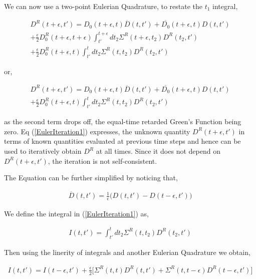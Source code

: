 \documentclass{amsart}
\begin{document}
    We can now use a two-point Eulerian Quadrature, to restate the $t_1$ integral,
    
    \begin{multline}\label{Euler}
        D^R(t+\epsilon , t') = D_0(t+\epsilon , t)\overline{D}(t , t')+\overline{D_0}(t+\epsilon , t)D(t , t')
        \\ + \frac{\epsilon}{2} D_0^R(t+\epsilon, t+\epsilon)\int^{t+\epsilon}_{t'} dt_2 \Sigma^R (t+\epsilon,t_2) D^R(t_2, t')
        \\ + \frac{\epsilon}{2} D_0^R(t+\epsilon, t)\int^{t}_{t'} dt_2 \Sigma^R (t,t_2) D^R(t_2, t')
    \end{multline}
    
    or,
    
    \begin{multline}\label{EulerIteration1}
        D^R(t+\epsilon , t') = D_0(t+\epsilon , t)\overline{D}(t , t')+\overline{D_0}(t+\epsilon , t)D(t , t')
        \\ + \frac{\epsilon}{2} D_0^R(t+\epsilon, t)\int^{t}_{t'} dt_2 \Sigma^R (t,t_2) D^R(t_2, t')
    \end{multline}
    
    as the second term drops off, the equal-time retarded Green's Function being zero. Eq (\ref{EulerIteration1}) expresses, the unknown quantity $D^R(t+\epsilon , t')$ in terms of known quantities evaluated at previous time steps and hence can be used to iteratively obtain $D^R$ at all times. Since it does not depend on $D^R(t+\epsilon , t')$, the iteration is not self-consistent.  
    
    The Equation can be further simplified by noticing that,
    
    \begin{align}
        \overline{D}(t , t')=\frac{1}{\epsilon}\big(D(t , t')-D(t-\epsilon , t')\big)
    \end{align}
    
    We define the integral in (\ref{EulerIteration1}) as,
    
    \begin{align}
        I(t,t')=\int^{t}_{t'} dt_2 \Sigma^R (t,t_2) D^R(t_2, t')
    \end{align}
    
    Then using the linerity of integrals and another Eulerian Quadrature we obtain,  
    
    \begin{align}\label{EulerIteration2}
        I(t,t')=I(t-\epsilon,t')+\frac{\epsilon}{2}\big[ \Sigma^R (t,t) D^R(t, t')+\Sigma^R (t,t-\epsilon) D^R(t-\epsilon, t')\big]  
    \end{align}
\end{document}
